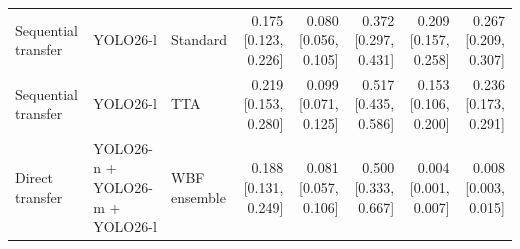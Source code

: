 \begin{table}[htbp]
{\begin{tabular}{lllrrrrr}
Sequential transfer & YOLO26-l & Standard & 0.175 [0.123, 0.226] & 0.080 [0.056, 0.105] & 0.372 [0.297, 0.431] & 0.209 [0.157, 0.258] & 0.267 [0.209, 0.307] \\
Sequential transfer & YOLO26-l & TTA & 0.219 [0.153, 0.280] & 0.099 [0.071, 0.125] & 0.517 [0.435, 0.586] & 0.153 [0.106, 0.200] & 0.236 [0.173, 0.291] \\
Direct transfer & YOLO26-n + YOLO26-m + YOLO26-l & WBF ensemble & 0.188 [0.131, 0.249] & 0.081 [0.057, 0.106] & 0.500 [0.333, 0.667] & 0.004 [0.001, 0.007] & 0.008 [0.003, 0.015] \\
\bottomrule
\end{tabular}
}
\end{table}
